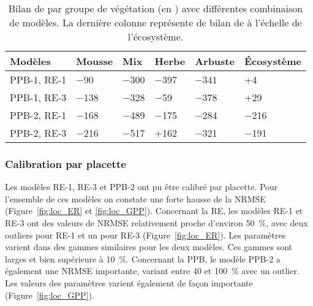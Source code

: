 \begin{table}
\centering
\caption{Bilan de \coo par groupe de végétation (en \si{\gcma}) avec différentes combinaison de modèles. La dernière colonne représente de bilan de \coo à l'échelle de l'écosystème.}
\label{table:bdc_grp}
\begin{tabular}{llllll}  \toprule
Modèles & Mousse & Mix & Herbe & Arbuste & Écosystème  \\ \midrule
PPB-1, RE-1 &  \num{-90} & \num{-300} & \num{-397} & \num{-341} & +\num{4}\\[+1ex]
PPB-1, RE-3 &  \num{-138} & \num{-328} & \num{-59} & \num{-378} & +\num{29} \\[+1ex]
PPB-2, RE-1 &  \num{-168} & \num{-489} & \num{-175} & \num{-284} & \num{-216} \\[+1ex]
PPB-2, RE-3 &  \num{-216} & \num{-517} & +\num{162} & \num{-321} & \num{-191}\\[+1ex]
\bottomrule
\end{tabular}
\end{table}

\subsubsection{Calibration par placette}

Les modèles RE-1, RE-3 et PPB-2 ont pu être calibré par placette.
Pour l'ensemble de ces modèles on constate une forte hausse de la NRMSE (Figure~\ref{fig:loc_ER} et \ref{fig:loc_GPP}).
Concernant la RE, les modèles RE-1 et RE-3 ont des valeurs de NRMSE relativement proche d'environ \SI{50}{\percent}, avec deux outliers pour RE-1 et un pour RE-3 (Figure~\ref{fig:loc_ER}).
Les paramètres varient dans des gammes similaires pour les deux modèles.
Ces gammes sont larges et bien supérieure à \SI{10}{\percent}.
Concernant la PPB, le modèle PPB-2 a également une NRMSE importante, variant entre 40 et \SI{100}{\percent} avec un outlier.
Les valeurs des paramètres varient également de façon importante (Figure~\ref{fig:loc_GPP}).

